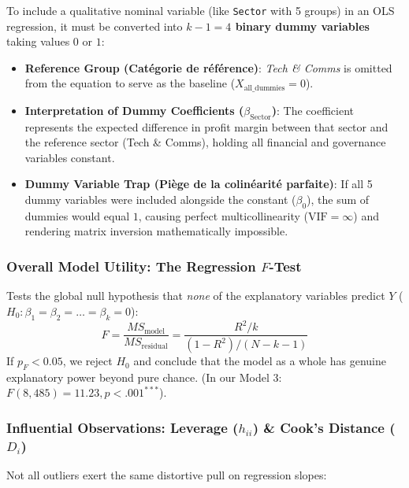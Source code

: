 \documentclass[
]{article}
\newcounter{none} %
\providecommand{\tightlist}{%
  \setlength{\itemsep}{0pt}\setlength{\parskip}{0pt}}
\begin{document}
To include a qualitative nominal variable (like \texttt{Sector} with 5
groups) in an OLS regression, it must be converted into
\textbf{\(k - 1 = 4\) binary dummy variables} taking values \(0\) or
\(1\):

\begin{itemize}
\tightlist
\item
  \textbf{Reference Group (Catégorie de référence)}: \emph{Tech \&
  Comms} is omitted from the equation to serve as the baseline
  (\(X_{\text{all\_dummies}} = 0\)).
\item
  \textbf{Interpretation of Dummy Coefficients
  (\(\beta_{\text{Sector}}\))}: The coefficient represents the expected
  difference in profit margin between that sector and the reference
  sector (Tech \& Comms), holding all financial and governance variables
  constant.
\item
  \textbf{Dummy Variable Trap (Piège de la colinéarité parfaite)}: If
  all 5 dummy variables were included alongside the constant
  (\(\beta_0\)), the sum of dummies would equal \(1\), causing perfect
  multicollinearity (\(\text{VIF} = \infty\)) and rendering matrix
  inversion mathematically impossible.
\end{itemize}

\subsubsection{\texorpdfstring{Overall Model Utility: The Regression
\(F\)-Test}{Overall Model Utility: The Regression F-Test}}\label{overall-model-utility-the-regression-f-test}

Tests the global null hypothesis that \emph{none} of the explanatory
variables predict \(Y\)
(\(H_0: \beta_1 = \beta_2 = \dots = \beta_k = 0\)):
\[F = \frac{MS_{\text{model}}}{MS_{\text{residual}}} = \frac{R^2 / k}{(1 - R^2) / (N - k - 1)}\]
If \(p_F < 0.05\), we reject \(H_0\) and conclude that the model as a
whole has genuine explanatory power beyond pure chance. (In our Model 3:
\(F(8, 485) = 11.23, p < .001^{***}\)).

\subsubsection{\texorpdfstring{Influential Observations: Leverage
(\(h_{ii}\)) \& Cook's Distance
(\(D_i\))}{Influential Observations: Leverage (h\_\{ii\}) \& Cook's Distance (D\_i)}}\label{influential-observations-leverage-h_ii-cooks-distance-d_i}

Not all outliers exert the same distortive pull on regression slopes:
\end{document}
